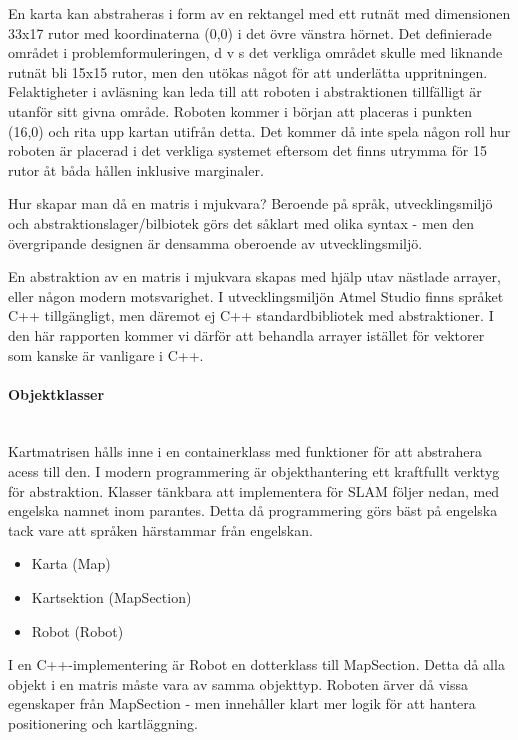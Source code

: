 \documentclass[a4paper,12pt,fleqn]{article}
\begin{document}
En karta kan abstraheras i form av en rektangel med ett rutnät med dimensionen 33x17 rutor med koordinaterna (0,0) i det övre vänstra hörnet. Det definierade området i problemformuleringen, d v s det verkliga området skulle med liknande rutnät bli 15x15 rutor, men den utökas något för att underlätta uppritningen. Felaktigheter i avläsning kan leda till att roboten i abstraktionen tillfälligt är utanför sitt givna område. Roboten kommer i början att placeras i punkten (16,0) och rita upp kartan utifrån detta. Det kommer då inte spela någon roll hur roboten är placerad i det verkliga systemet eftersom det finns utrymma för 15 rutor åt båda hållen inklusive marginaler. 

Hur skapar man då en matris i mjukvara? Beroende på språk, utvecklingsmiljö och abstraktionslager/bilbiotek görs det såklart med olika syntax - men den övergripande designen är densamma oberoende av utvecklingsmiljö. 

En abstraktion av en matris i mjukvara skapas med hjälp utav nästlade arrayer, eller någon modern motsvarighet. I utvecklingsmiljön Atmel Studio finns språket C++ tillgängligt, men däremot ej C++ standardbibliotek med abstraktioner. I den här rapporten kommer vi därför att behandla arrayer istället för vektorer som kanske är vanligare i C++. 

\paragraph{Objektklasser}
~\\
Kartmatrisen hålls inne i en containerklass med funktioner för att abstrahera acess till den. I modern programmering är objekthantering ett kraftfullt verktyg för abstraktion. Klasser tänkbara att implementera för SLAM följer nedan, med engelska namnet inom parantes. Detta då programmering görs bäst på engelska tack vare att språken härstammar från engelskan. 

\begin{itemize}
	\item Karta (Map)
	\item Kartsektion (MapSection)
	\item Robot (Robot)
\end{itemize}

I en C++-implementering är Robot en dotterklass till MapSection. Detta då alla objekt i en matris måste vara av samma objekttyp. Roboten ärver då vissa egenskaper från MapSection - men innehåller klart mer logik för att hantera positionering och kartläggning. 
\end{document}
